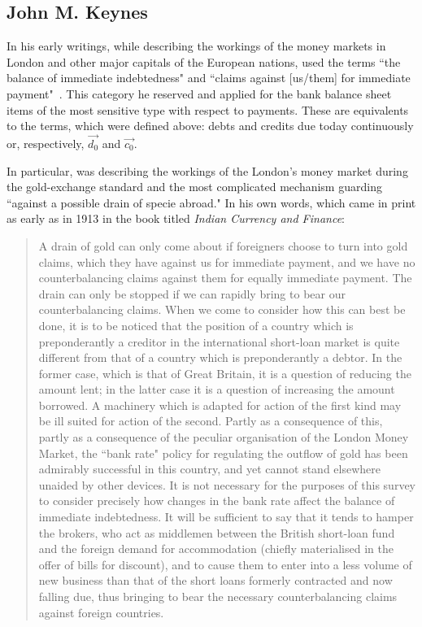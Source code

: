 \subsection{John M. Keynes}

In his early writings, while describing the workings of the money markets in London and other major capitals of the European nations, \citeauthor{keynes1971_1} used the terms ``the balance of immediate indebtedness" and ``claims against [us/them] for immediate payment"~\citep[pp.~13,16]{keynes1971_1}. This category he reserved and applied for the bank balance sheet items of the most sensitive type with respect to payments. These are equivalents to the terms, which were defined above: debts and credits due today continuously or, respectively, $\overrightarrow{d_0}$ and $\overrightarrow{c_0}$.

In particular, \citeauthor{keynes1971_1} was describing the workings of the London's money market during the gold-exchange standard and the most complicated mechanism guarding ``against a possible drain of specie abroad." In his own words, which came in print as early as in 1913 in the book titled \textit{Indian Currency and Finance}:

\begin{quote}
A drain of gold can only come about if foreigners choose to turn into gold claims, which they have against us for immediate payment, and we have no counterbalancing claims against them for equally immediate payment. The drain can only be stopped if we can rapidly bring to bear our counterbalancing claims. When we come to consider how this can best be done, it is to be noticed that the position of a country which is preponderantly a creditor in the international short-loan market is quite different from that of a country which is preponderantly a debtor. In the former case, which is that of Great Britain, it is a question of reducing the amount lent; in the latter case it is a question of increasing the amount borrowed. A machinery which is adapted for action of the first kind may be ill suited for action of the second. Partly as a consequence of this, partly as a consequence of the peculiar organisation of the London Money Market, the ``bank rate" policy for regulating the outflow of gold has been admirably successful in this country, and yet cannot stand elsewhere unaided by other devices. It is not necessary for the purposes of this survey to consider precisely how changes in the bank rate affect the balance of immediate indebtedness. It will be sufficient to say that it tends to hamper the brokers, who act as middlemen between the British short-loan fund and the foreign demand for accommodation (chiefly materialised in the offer of bills for discount), and to cause them to enter into a less volume of new business than that of the short loans formerly contracted and now falling due, thus bringing to bear the necessary counterbalancing claims against foreign countries.~\citep[pp.~12-13]{keynes1971_1}
\end{quote}

